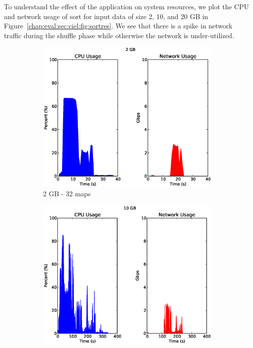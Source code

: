 \documentclass[a4paper,12pt,twoside,openright]{report}
\begin{document}
To understand the effect of the application on system resources, we plot the CPU
and network usage of sort for input data of size 2, 10, and 20 GB in
Figure~\ref{chap:eval:sec:ciel:fig:sortres}. We see that there is a spike in
network traffic during the shuffle phase while otherwise the network is
under-utilized.

\begin{figure}[h!]
        \begin{subfigure}[b]{0.33\textwidth}
                \centering
                \includegraphics[width=\textwidth]{32maps.csv.eps}
                \caption{2 GB - 32 maps}
                \label{fig:2GBsortres}
        \end{subfigure}%
        \begin{subfigure}[b]{0.33\textwidth}
                \centering
                \includegraphics[width=\textwidth]{160maps.csv.eps}

\end{subfigure}
\end{figure}
\end{document}
